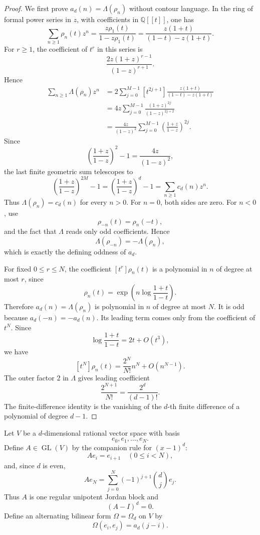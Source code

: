\documentclass[a4paper,11pt]{amsart}
\theoremstyle{remark}
\newcommand{\Q}{\mathbb Q}
\DeclareMathOperator{\GL}{GL}
\numberwithin{equation}{section}
\begin{document}
\begin{proof}
We first prove \(a_d(n)=\Lambda(\rho_n)\) without contour language.  In the ring of formal power series in \(z\), with coefficients in \(\Q[[t]]\), one has
\[
        \sum_{n\ge1}\rho_n(t)z^n
        =
        \frac{z\rho_1(t)}{1-z\rho_1(t)}
        =
        \frac{z(1+t)}{(1-t)-z(1+t)}.
\]
For \(r\ge1\), the coefficient of \(t^r\) in this series is
\[
        \frac{2z(1+z)^{r-1}}{(1-z)^{r+1}}.
\]
Hence
\[
\begin{aligned}
        \sum_{n\ge1}\Lambda(\rho_n)z^n
        &=
        2\sum_{j=0}^{M-1}
        [t^{2j+1}]
        \frac{z(1+t)}{(1-t)-z(1+t)}                         \\
        &=
        4z\sum_{j=0}^{M-1}
        \frac{(1+z)^{2j}}{(1-z)^{2j+2}}                      \\
        &=
        \frac{4z}{(1-z)^2}
        \sum_{j=0}^{M-1}
        \left(\frac{1+z}{1-z}\right)^{2j}.
\end{aligned}
\]
Since
\[
        \left(\frac{1+z}{1-z}\right)^2-1
        =
        \frac{4z}{(1-z)^2},
\]
the last finite geometric sum telescopes to
\[
        \left(\frac{1+z}{1-z}\right)^{2M}-1
        =
        \left(\frac{1+z}{1-z}\right)^d-1
        =
        \sum_{n\ge1}c_d(n)z^n.
\]
Thus \(\Lambda(\rho_n)=c_d(n)\) for every \(n>0\).  For \(n=0\), both sides are zero.  For \(n<0\), use
\[
        \rho_{-n}(t)=\rho_n(-t),
\]
and the fact that \(\Lambda\) reads only odd coefficients.  Hence
\[
        \Lambda(\rho_{-n})=-\Lambda(\rho_n),
\]
which is exactly the defining oddness of \(a_d\).

For fixed \(0\le r\le N\), the coefficient \([t^r]\rho_n(t)\) is a polynomial in \(n\) of degree at most \(r\), since
\[
        \rho_n(t)
        =
        \exp\left(n\log\frac{1+t}{1-t}\right).
\]
Therefore \(a_d(n)=\Lambda(\rho_n)\) is polynomial in \(n\) of degree at most \(N\).  It is odd because \(a_d(-n)=-a_d(n)\).  Its leading term comes only from the coefficient of \(t^N\).  Since
\[
        \log\frac{1+t}{1-t}=2t+O(t^3),
\]
we have
\[
        [t^N]\rho_n(t)
        =
        \frac{2^N}{N!}n^N+O(n^{N-1}).
\]
The outer factor \(2\) in \(\Lambda\) gives leading coefficient
\[
        \frac{2^{N+1}}{N!}
        =
        \frac{2^d}{(d-1)!}.
\]
The finite-difference identity is the vanishing of the \(d\)-th finite difference of a polynomial of degree \(d-1\).
\end{proof}

Let \(V\) be a \(d\)-dimensional rational vector space with basis
\[
        e_0,e_1,\ldots,e_N.
\]
Define \(A\in\GL(V)\) by the companion rule for \((x-1)^d\):
\[
        Ae_i=e_{i+1}\quad(0\le i<N),
\]
and, since \(d\) is even,
\[
        Ae_N=\sum_{j=0}^{N}(-1)^{j+1}\binom dj e_j.
\]
Thus \(A\) is one regular unipotent Jordan block and
\[
        (A-I)^d=0.
\]
Define an alternating bilinear form \(\Omega=\Omega_d\) on \(V\) by
\[
        \Omega(e_i,e_j)=a_d(j-i).
\]
\end{document}
